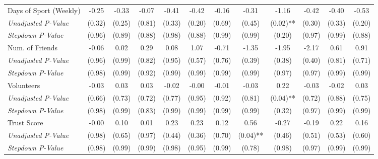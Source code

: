 \begin{tabular}{l c c c c c c c c c c c}
Days of Sport (Weekly) & -0.25 & -0.33 & -0.07 & -0.41 & -0.42 & -0.16 & -0.31 & -1.16 & -0.42 & -0.40 & -0.53 \\
\quad \textit{Unadjusted P-Value} & (0.32) & (0.25) & (0.81) & (0.33) & (0.20) & (0.69) & (0.45) & (0.02)** & (0.30) & (0.33) & (0.20) \\
\quad \textit{Stepdown P-Value} & (0.96) & (0.89) & (0.88) & (0.98) & (0.88) & (0.99) & (0.99) & (0.20) & (0.97) & (0.99) & (0.88) \\
Num. of Friends & -0.06 & 0.02 & 0.29 & 0.08 & 1.07 & -0.71 & -1.35 & -1.95 & -2.17 & 0.61 & 0.91 \\
\quad \textit{Unadjusted P-Value} & (0.96) & (0.99) & (0.82) & (0.95) & (0.57) & (0.76) & (0.39) & (0.38) & (0.40) & (0.81) & (0.71) \\
\quad \textit{Stepdown P-Value} & (0.98) & (0.99) & (0.92) & (0.99) & (0.99) & (0.99) & (0.99) & (0.97) & (0.97) & (0.99) & (0.99) \\
Volunteers & -0.03 & 0.03 & 0.03 & -0.02 & -0.00 & -0.01 & -0.03 & 0.22 & -0.03 & -0.02 & 0.03 \\
\quad \textit{Unadjusted P-Value} & (0.66) & (0.73) & (0.72) & (0.77) & (0.95) & (0.92) & (0.81) & (0.04)** & (0.72) & (0.88) & (0.75) \\
\quad \textit{Stepdown P-Value} & (0.98) & (0.99) & (0.83) & (0.99) & (0.99) & (0.99) & (0.99) & (0.32) & (0.97) & (0.99) & (0.99) \\
Trust Score & -0.00 & 0.10 & 0.01 & 0.23 & 0.23 & 0.12 & 0.56 & -0.27 & -0.19 & 0.22 & 0.16 \\
\quad \textit{Unadjusted P-Value} & (0.98) & (0.65) & (0.97) & (0.44) & (0.36) & (0.70) & (0.04)** & (0.46) & (0.51) & (0.53) & (0.60) \\
\quad \textit{Stepdown P-Value} & (0.98) & (0.99) & (0.99) & (0.98) & (0.95) & (0.99) & (0.78) & (0.98) & (0.97) & (0.99) & (0.99) \\
\bottomrule
\end{tabular}
